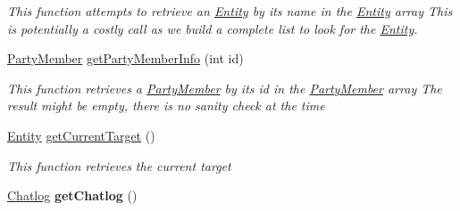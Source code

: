\begin{DoxyCompactItemize}
\begin{DoxyCompactList}\small\item\em This function attempts to retrieve an \hyperlink{classffxivlib_1_1_entity}{Entity} by its name in the \hyperlink{classffxivlib_1_1_entity}{Entity} array This is potentially a costly call as we build a complete list to look for the \hyperlink{classffxivlib_1_1_entity}{Entity}. \end{DoxyCompactList}\item 
\hyperlink{classffxivlib_1_1_party_member}{Party\-Member} \hyperlink{classffxivlib_1_1_f_f_x_i_v_l_i_b_a8cd7985eb9beb13c092ae1ed5f21c9f8}{get\-Party\-Member\-Info} (int id)
\begin{DoxyCompactList}\small\item\em This function retrieves a \hyperlink{classffxivlib_1_1_party_member}{Party\-Member} by its id in the \hyperlink{classffxivlib_1_1_party_member}{Party\-Member} array The result might be empty, there is no sanity check at the time \end{DoxyCompactList}\item 
\hyperlink{classffxivlib_1_1_entity}{Entity} \hyperlink{classffxivlib_1_1_f_f_x_i_v_l_i_b_aee1b206ae927123785f8362b4761aec3}{get\-Current\-Target} ()
\begin{DoxyCompactList}\small\item\em This function retrieves the current target \end{DoxyCompactList}\item 
\hypertarget{classffxivlib_1_1_f_f_x_i_v_l_i_b_acb5cc13e23647bd93e9f550a7a6961d3}{\hyperlink{classffxivlib_1_1_chatlog}{Chatlog} {\bfseries get\-Chatlog} ()}\label{classffxivlib_1_1_f_f_x_i_v_l_i_b_acb5cc13e23647bd93e9f550a7a6961d3}


\end{DoxyCompactItemize}
